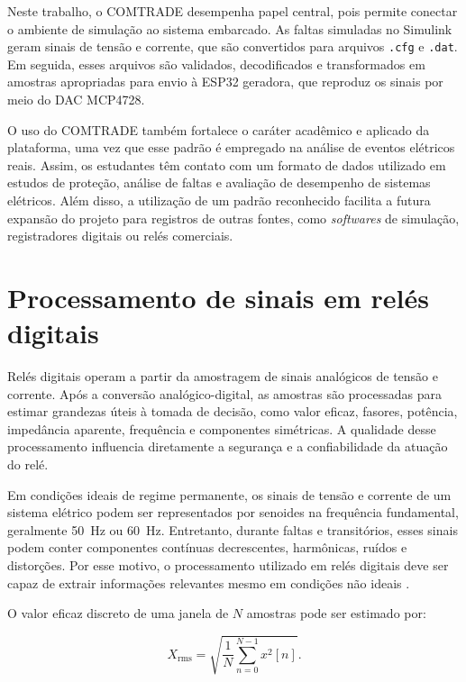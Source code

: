 Neste trabalho, o COMTRADE desempenha papel central, pois permite conectar o ambiente de simulação ao sistema embarcado. As faltas simuladas no Simulink geram sinais de tensão e corrente, que são convertidos para arquivos \texttt{.cfg} e \texttt{.dat}. Em seguida, esses arquivos são validados, decodificados e transformados em amostras apropriadas para envio à ESP32 geradora, que reproduz os sinais por meio do DAC MCP4728.

O uso do COMTRADE também fortalece o caráter acadêmico e aplicado da plataforma, uma vez que esse padrão é empregado na análise de eventos elétricos reais. Assim, os estudantes têm contato com um formato de dados utilizado em estudos de proteção, análise de faltas e avaliação de desempenho de sistemas elétricos. Além disso, a utilização de um padrão reconhecido facilita a futura expansão do projeto para registros de outras fontes, como \textit{softwares} de simulação, registradores digitais ou relés comerciais.

\section{Processamento de sinais em relés digitais}

Relés digitais operam a partir da amostragem de sinais analógicos de tensão e corrente. Após a conversão analógico-digital, as amostras são processadas para estimar grandezas úteis à tomada de decisão, como valor eficaz, fasores, potência, impedância aparente, frequência e componentes simétricas. A qualidade desse processamento influencia diretamente a segurança e a confiabilidade da atuação do relé.

Em condições ideais de regime permanente, os sinais de tensão e corrente de um sistema elétrico podem ser representados por senoides na frequência fundamental, geralmente \SI{50}{\hertz} ou \SI{60}{\hertz}. Entretanto, durante faltas e transitórios, esses sinais podem conter componentes contínuas decrescentes, harmônicas, ruídos e distorções. Por esse motivo, o processamento utilizado em relés digitais deve ser capaz de extrair informações relevantes mesmo em condições não ideais \cite{phadke2009computer}.

O valor eficaz discreto de uma janela de $N$ amostras pode ser estimado por:

\begin{equation}
  X_{\text{rms}} = \sqrt{\frac{1}{N}\sum_{n=0}^{N-1} x^2[n]}.
  \label{eq:rms-discreto}
\end{equation}

